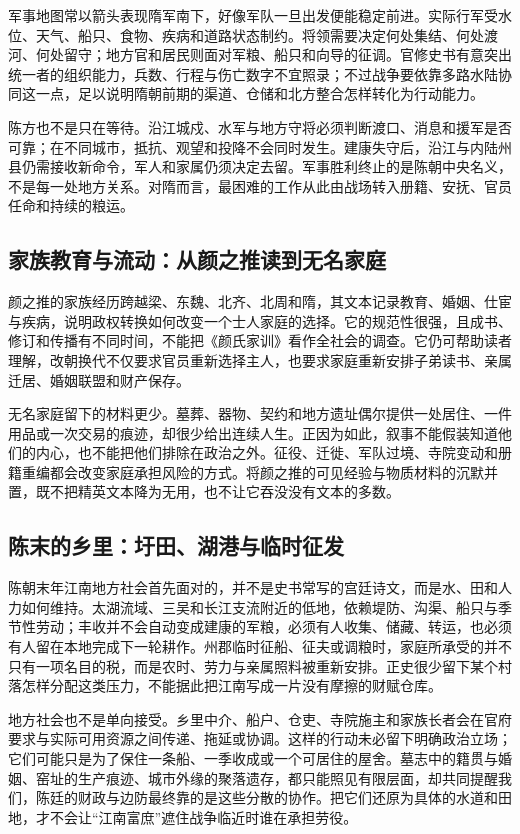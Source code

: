 军事地图常以箭头表现隋军南下，好像军队一旦出发便能稳定前进。实际行军受水位、天气、船只、食物、疾病和道路状态制约。将领需要决定何处集结、何处渡河、何处留守；地方官和居民则面对军粮、船只和向导的征调。官修史书有意突出统一者的组织能力，兵数、行程与伤亡数字不宜照录；不过战争要依靠多路水陆协同这一点，足以说明隋朝前期的渠道、仓储和北方整合怎样转化为行动能力。

陈方也不是只在等待。沿江城戍、水军与地方守将必须判断渡口、消息和援军是否可靠；在不同城市，抵抗、观望和投降不会同时发生。建康失守后，沿江与内陆州县仍需接收新命令，军人和家属仍须决定去留。军事胜利终止的是陈朝中央名义，不是每一处地方关系。对隋而言，最困难的工作从此由战场转入册籍、安抚、官员任命和持续的粮运。

\subsection{家族教育与流动：从颜之推读到无名家庭}

颜之推的家族经历跨越梁、东魏、北齐、北周和隋，其文本记录教育、婚姻、仕宦与疾病，说明政权转换如何改变一个士人家庭的选择。它的规范性很强，且成书、修订和传播有不同时间，不能把《颜氏家训》看作全社会的调查。它仍可帮助读者理解，改朝换代不仅要求官员重新选择主人，也要求家庭重新安排子弟读书、亲属迁居、婚姻联盟和财产保存。

无名家庭留下的材料更少。墓葬、器物、契约和地方遗址偶尔提供一处居住、一件用品或一次交易的痕迹，却很少给出连续人生。正因为如此，叙事不能假装知道他们的内心，也不能把他们排除在政治之外。征役、迁徙、军队过境、寺院变动和册籍重编都会改变家庭承担风险的方式。将颜之推的可见经验与物质材料的沉默并置，既不把精英文本降为无用，也不让它吞没没有文本的多数。

\subsection{陈末的乡里：圩田、湖港与临时征发}

陈朝末年江南地方社会首先面对的，并不是史书常写的宫廷诗文，而是水、田和人力如何维持。太湖流域、三吴和长江支流附近的低地，依赖堤防、沟渠、船只与季节性劳动；丰收并不会自动变成建康的军粮，必须有人收集、储藏、转运，也必须有人留在本地完成下一轮耕作。州郡临时征船、征夫或调粮时，家庭所承受的并不只有一项名目的税，而是农时、劳力与亲属照料被重新安排。正史很少留下某个村落怎样分配这类压力，不能据此把江南写成一片没有摩擦的财赋仓库。

地方社会也不是单向接受。乡里中介、船户、仓吏、寺院施主和家族长者会在官府要求与实际可用资源之间传递、拖延或协调。这样的行动未必留下明确政治立场；它们可能只是为了保住一条船、一季收成或一个可居住的屋舍。墓志中的籍贯与婚姻、窑址的生产痕迹、城市外缘的聚落遗存，都只能照见有限层面，却共同提醒我们，陈廷的财政与边防最终靠的是这些分散的协作。把它们还原为具体的水道和田地，才不会让“江南富庶”遮住战争临近时谁在承担劳役。


